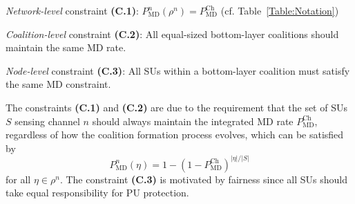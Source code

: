 \documentclass[journal,draftclsnofoot,onecolumn]{IEEEtran}
\theoremstyle{definition}
\begin{document}
\noindent \emph{Network-level} constraint \textbf{(C.1)}: $P_\mathrm{MD}^n(\rho^n)=P_\mathrm{MD}^\mathrm{Ch}$ (cf. Table~\ref{Table:Notation})

\noindent \emph{Coalition-level} constraint \textbf{(C.2)}: All equal-sized bottom-layer coalitions should maintain the same MD rate.

\noindent \emph{Node-level} constraint \textbf{(C.3)}: All SUs within a bottom-layer coalition must satisfy the same MD constraint\cite{RLiuEvoGame,YCLiangWCNC}.

The constraints \textbf{(C.1)} and \textbf{(C.2)} are due to the requirement that the set of SUs $S$ sensing channel $n$ should always maintain the integrated MD rate $P_\mathrm{MD}^\mathrm{Ch}$, regardless of how the coalition formation process evolves, which can be satisfied by
\begin{equation}\label{Eq:EtaMD}
P_\mathrm{MD}^n({\eta})=1-(1-P_\mathrm{MD}^\mathrm{Ch})^{|\eta|/{|S|}}
\end{equation}
for all $\eta\in\rho^n$. The constraint \textbf{(C.3)} is motivated by fairness since all SUs should take equal responsibility for PU protection.
\end{document}
